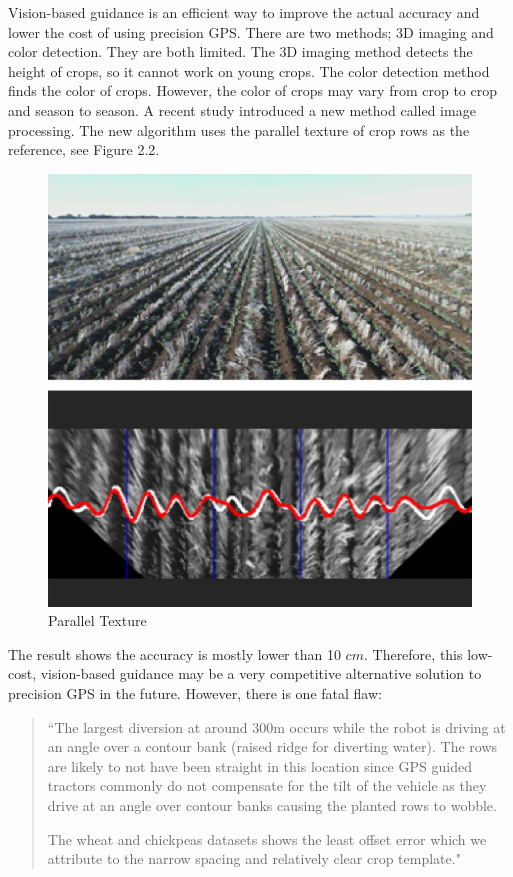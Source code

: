 Vision-based guidance is an efficient way to improve the actual accuracy and lower the cost of using precision GPS. There are two methods; 3D imaging and color detection. They are both limited. The 3D imaging method detects the height of crops, so it cannot work on young crops. The color detection method finds the color of crops. However, the color of crops may vary from crop to crop and season to season. A recent study introduced a new method called image processing. The new algorithm uses the parallel texture of crop rows as the reference, see Figure 2.2. \cite{english2014vision}

\begin{figure}[ht!]
\begin{center}
\includegraphics[scale = 0.45]{pics/parallel.jpg}
\caption{Parallel Texture}
\end{center}
\end{figure}

The result shows the accuracy is mostly lower than 10 $cm$. Therefore, this low-cost, vision-based guidance may be a very competitive alternative solution to precision GPS in the future. However, there is one fatal flaw: \cite{english2014vision}
\begin{quote}
``The largest diversion at around 300m occurs while the robot is driving at an angle over a contour bank (raised ridge for diverting water). The rows are likely to not have been straight in this location since GPS guided tractors commonly do not compensate for the tilt of the vehicle as they drive at an angle over contour banks causing the planted rows to wobble.

The wheat and chickpeas datasets shows the least offset error which we attribute to the narrow spacing and relatively clear crop template."
\end{quote}

